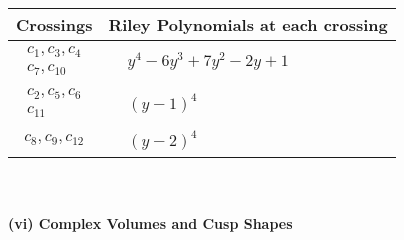 \documentclass[1p]{elsarticle_modified}
\theoremstyle{definition}
\begin{document}
\begin{tabular}{m{50pt}|m{274pt}}
Crossings & \hspace{64pt}Riley Polynomials at each crossing \\
\hline $$\begin{aligned}c_{1},c_{3},c_{4}\\c_{7},c_{10}\end{aligned}$$&$\begin{aligned}
&y^4-6 y^3+7 y^2-2 y+1
\end{aligned}$\\
\hline $$\begin{aligned}c_{2},c_{5},c_{6}\\c_{11}\end{aligned}$$&$\begin{aligned}
&(y-1)^4
\end{aligned}$\\
\hline $$\begin{aligned}c_{8},c_{9},c_{12}\end{aligned}$$&$\begin{aligned}
&(y-2)^4
\end{aligned}$\\
\hline
\end{tabular}\\~\\
\newpage\flushleft \textbf{(vi) Complex Volumes and Cusp Shapes}
\end{document}
